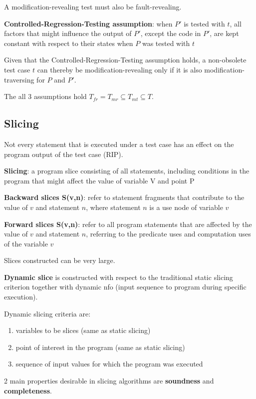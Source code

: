 \documentclass[11pt]{article}
\begin{document}
A modification-revealing test must also be fault-revealing.

\textbf{Controlled-Regression-Testing assumption}: when \(P'\) is tested with \(t\), all
factors that might influence the output of \(P'\), except the code in \(P'\), are
kept constant with respect to their states when \(P\) was tested with \(t\)

Given that the Controlled-Regression-Testing assumption holds, a non-obsolete
test case \(t\) can thereby be modification-revealing only if it is also
modification-traversing for \(P\) and \(P'\).

The all 3 assumptions hold \(T_{fr} = T_{mr} \subseteq T_{mt} \subseteq T\).
\subsection{Slicing}
\label{sec:org4d2de7d}
Not every statement that is executed under a test case has an effect on the
program output of the test case (RIP).

\textbf{Slicing}: a program slice consisting of all statements, including conditions
in the program that might affect the value of variable V and point P

\textbf{Backward slices S(v,n)}: refer to statement fragments that contribute to
the value of \(v\) and statement \(n\), where statement \(n\) is a use node of
variable \(v\)

\textbf{Forward slices S(v,n)}: refer to all program statements that are affected
by the value of \(v\) and statement \(n\), referring to the predicate uses
and computation uses of the variable \(v\)

Slices constructed can be very large.

\textbf{Dynamic slice} is constructed with respect to the traditional static slicing
criterion together with dynamic nfo (input sequence to program during specific
execution).

Dynamic slicing criteria are:
\begin{enumerate}
\item variables to be slices (same as static slicing)
\item point of interest in the program (same as static slicing)
\item sequence of input values for which the program was executed
\end{enumerate}

2 main properties desirable in slicing algorithms are \textbf{soundness}
and \textbf{completeness}.
\end{document}
